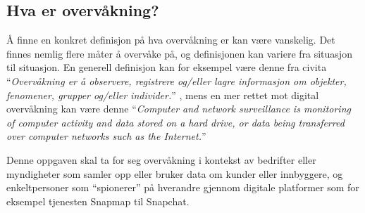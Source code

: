 \subsection{Hva er overvåkning?}
Å finne en konkret definisjon på hva overvåkning er kan være vanskelig. Det finnes nemlig flere måter å overvåke på, og definisjonen kan variere fra situasjon til situasjon. En generell definisjon kan for eksempel være denne fra civita ``\textit{Overvåkning er å observere, registrere og/eller lagre informasjon om objekter, fenomener, grupper og/eller individer.}'' \parencite{artikkel:civita_overvåkning}, mens en mer rettet mot digital overvåkning kan være denne ``\textit{Computer and network surveillance is monitoring of computer activity and data stored on a hard drive, or data being transferred over computer networks such as the Internet.}'' \parencite{artikkel:wikipedia_overvåkning}

Denne oppgaven skal ta for seg overvåkning i kontekst av bedrifter eller myndigheter som samler opp eller bruker data om kunder eller innbyggere, og enkeltpersoner som ``spionerer'' på hverandre gjennom digitale platformer som for eksempel tjenesten Snapmap til Snapchat.

\newpage